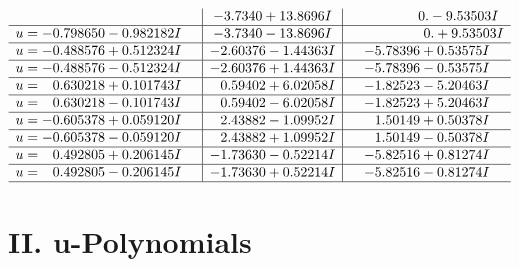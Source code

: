 \documentclass[1p]{elsarticle_modified}
\theoremstyle{definition}
\begin{document}
$$\begin{array}{c|c|c}
 & -3.7340 + 13.8696 I & \phantom{-0.000000 } 0. - 9.53503 I \\ \hline\begin{aligned}
u &= -0.798650 - 0.982182 I\end{aligned}
 & -3.7340 - 13.8696 I & \phantom{-0.000000 -}0. + 9.53503 I \\ \hline\begin{aligned}
u &= -0.488576 + 0.512324 I\end{aligned}
 & -2.60376 - 1.44363 I & -5.78396 + 0.53575 I \\ \hline\begin{aligned}
u &= -0.488576 - 0.512324 I\end{aligned}
 & -2.60376 + 1.44363 I & -5.78396 - 0.53575 I \\ \hline\begin{aligned}
u &= \phantom{-}0.630218 + 0.101743 I\end{aligned}
 & \phantom{-}0.59402 + 6.02058 I & -1.82523 - 5.20463 I \\ \hline\begin{aligned}
u &= \phantom{-}0.630218 - 0.101743 I\end{aligned}
 & \phantom{-}0.59402 - 6.02058 I & -1.82523 + 5.20463 I \\ \hline\begin{aligned}
u &= -0.605378 + 0.059120 I\end{aligned}
 & \phantom{-}2.43882 - 1.09952 I & \phantom{-}1.50149 + 0.50378 I \\ \hline\begin{aligned}
u &= -0.605378 - 0.059120 I\end{aligned}
 & \phantom{-}2.43882 + 1.09952 I & \phantom{-}1.50149 - 0.50378 I \\ \hline\begin{aligned}
u &= \phantom{-}0.492805 + 0.206145 I\end{aligned}
 & -1.73630 - 0.52214 I & -5.82516 + 0.81274 I \\ \hline\begin{aligned}
u &= \phantom{-}0.492805 - 0.206145 I\end{aligned}
 & -1.73630 + 0.52214 I & -5.82516 - 0.81274 I\\
 \hline 
 \end{array}$$\newpage
\newpage\renewcommand{\arraystretch}{1}
\centering \section*{ II. u-Polynomials}
\end{document}

